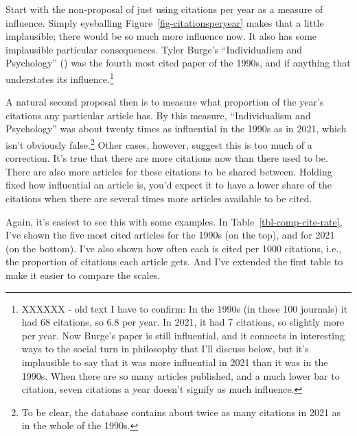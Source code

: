\documentclass[
  12pt,
  letterpaper,
  DIV=11,
  numbers=noendperiod]{scrartcl}
\begin{document}
Start with the non-proposal of just using citations per year as a
measure of influence. Simply eyeballing
Figure~\ref{fig-citationsperyear} makes that a little implausible; there
would be so much more influence now. It also has some implausible
particular consequences. Tyler Burge's ``Individualism and Psychology''
() was the fourth most
cited paper of the 1990s, and if anything that understates its
influence.\footnote{XXXXXX - old text I have to confirm: In the 1990s
  (in these 100 journals) it had 68 citations, so 6.8 per year. In 2021,
  it had 7 citations, so slightly more per year. Now Burge's paper is
  still influential, and it connects in interesting ways to the social
  turn in philosophy that I'll discuss below, but it's implausible to
  say that it was more influential in 2021 than it was in the 1990s.
  When there are so many articles published, and a much lower bar to
  citation, seven citations a year doesn't signify as much influence.}

A natural second proposal then is to measure what proportion of the
year's citations any particular article has. By this measure,
``Individualism and Psychology'' was about twenty times as influential
in the 1990s as in 2021, which isn't obviously false.\footnote{To be
  clear, the database contains about twice as many citations in 2021 as
  in the whole of the 1990s.} Other cases, however, suggest this is too
much of a correction. It's true that there are more citations now than
there used to be. There are also more articles for these citations to be
shared between. Holding fixed how influential an article is, you'd
expect it to have a lower share of the citations when there are several
times more articles available to be cited.

Again, it's easiest to see this with some examples. In
Table~\ref{tbl-comp-cite-rate}, I've shown the five most cited articles
for the 1990s (on the top), and for 2021 (on the bottom). I've also
shown how often each is cited per 1000 citations, i.e., the proportion
of citations each article gets. And I've extended the first table to
make it easier to compare the scales.
\end{document}
